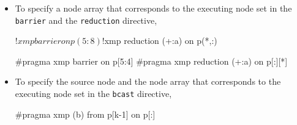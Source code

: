 \begin{itemize}
\item To specify a node array that corresponds to the executing node set
      in the {\tt barrier} and the {\tt reduction} directive,\\


\begin{minipage}{0.43\hsize}
\begin{center}
\begin{XFexample}
!$xmp barrier on p(5:8)
!$xmp reduction (+:a) on p(*,:)
\end{XFexample}
\end{center}
\end{minipage}
%
\begin{minipage}{0.54\hsize}
\begin{center}
\begin{XCexampleR}
#pragma xmp barrier on p[5:4]
#pragma xmp reduction (+:a) on p[:][*]
\end{XCexampleR}
\end{center}
\end{minipage}

\item To specify the source node and the node array that corresponds to
      the executing node set in the {\tt bcast} directive,\\


\begin{minipage}{0.43\hsize}
\begin{center}
\end{center}
\end{minipage}
%
\begin{minipage}{0.54\hsize}
\begin{center}
\begin{XCexampleR}
#pragma xmp (b) from p[k-1] on p[:]
\end{XCexampleR}
\end{center}
\end{minipage}

\end{itemize}

